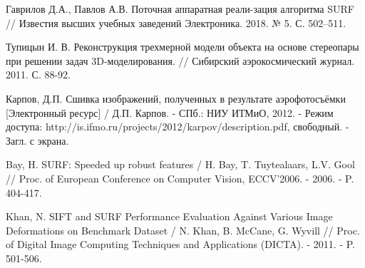 \begin{thebibliography}{1}
	Гаврилов Д.А., Павлов А.В. Поточная аппаратная реали-зация алгоритма SURF // Известия высших учебных заведений Электроника. 2018. № 5. С. 502–511.
	
	Тупицын И. В. Реконструкция трехмерной модели объекта на основе стереопары при решении задач 3D-моделирования. // Сибирский аэрокосмический журнал. 2011. С. 88-92.
	
	Карпов, Д.П. Сшивка изображений, полученных в результате аэрофотосъёмки [Электронный ресурс] / Д.П. Карпов. - СПб.: НИУ ИТМиО, 2012. - Режим доступа: http://is.ifmo.ru/projects/2012/karpov/description.pdf, свободный. - Загл. с экрана.
	
	Bay, H. SURF: Speeded up robust features / H. Bay, T. Tuytealaars, L.V. Gool // Proc. of European Conference on Computer Vision, ECCV'2006. - 2006. - P. 404-417.
	
	Khan, N. SIFT and SURF Performance Evaluation Against Various Image Deformations on Benchmark Dataset / N. Khan, B. McCane, G. Wyvill // Proc. of Digital Image Computing Techniques and Applications (DICTA). - 2011. - P. 501-506.
	
\end{thebibliography}
